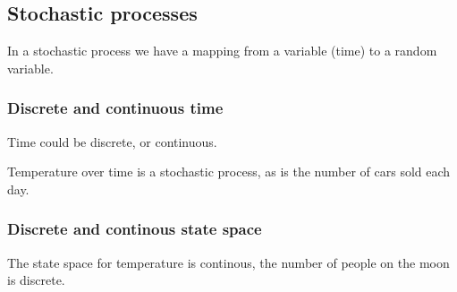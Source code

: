 
\subsection{Stochastic processes}

In a stochastic process we have a mapping from a variable (time) to a random variable.

\subsubsection{Discrete and continuous time}

Time could be discrete, or continuous.

Temperature over time is a stochastic process, as is the number of cars sold each day.

\subsubsection{Discrete and continous state space}

The state space for temperature is continous, the number of people on the moon is discrete.

